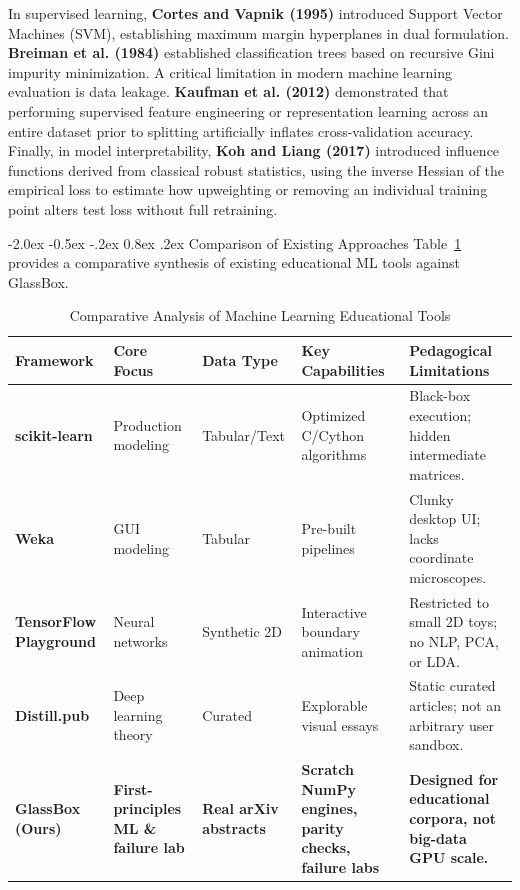 \documentclass[12pt,a4paper]{report}
\makeatletter
\renewcommand\section{\@startsection {section}{1}{\z@}%
                                   {-2.0ex \@plus -0.5ex \@minus -.2ex}%
                                   {0.8ex \@plus.2ex}%
                                   {\normalfont\fontsize{14}{17}\bfseries\color{headerblue}}}
\makeatother
\begin{document}
In supervised learning, \textbf{Cortes and Vapnik (1995)} \cite{vapnik1995} introduced Support Vector Machines (SVM), establishing maximum margin hyperplanes in dual formulation. \textbf{Breiman et al. (1984)} \cite{breiman1984} established classification trees based on recursive Gini impurity minimization. A critical limitation in modern machine learning evaluation is data leakage. \textbf{Kaufman et al. (2012)} \cite{kaufman2012} demonstrated that performing supervised feature engineering or representation learning across an entire dataset prior to splitting artificially inflates cross-validation accuracy. Finally, in model interpretability, \textbf{Koh and Liang (2017)} \cite{koh2017} introduced influence functions derived from classical robust statistics, using the inverse Hessian of the empirical loss to estimate how upweighting or removing an individual training point alters test loss without full retraining.

\section{Comparison of Existing Approaches}
Table~\ref{tab:lit_review} provides a comparative synthesis of existing educational ML tools against GlassBox.

\begin{table}[!ht]
\centering
\caption[Comparative Analysis of Educational ML Tools]{Comparative Analysis of Machine Learning Educational Tools}
\label{tab:lit_review}
\small
\begin{tabular}{|p{2.1cm}|p{2.6cm}|p{2.0cm}|p{3.4cm}|p{3.8cm}|}
\hline
\textbf{Framework} & \textbf{Core Focus} & \textbf{Data Type} & \textbf{Key Capabilities} & \textbf{Pedagogical Limitations} \\ \hline
\textbf{scikit-learn} \cite{scikit-learn} & Production modeling & Tabular/Text & Optimized C/Cython algorithms & Black-box execution; hidden intermediate matrices. \\ \hline
\textbf{Weka} & GUI modeling & Tabular & Pre-built pipelines & Clunky desktop UI; lacks coordinate microscopes. \\ \hline
\textbf{TensorFlow Playground} & Neural networks & Synthetic 2D & Interactive boundary animation & Restricted to small 2D toys; no NLP, PCA, or LDA. \\ \hline
\textbf{Distill.pub} & Deep learning theory & Curated & Explorable visual essays & Static curated articles; not an arbitrary user sandbox. \\ \hline
\textbf{GlassBox (Ours)} & \textbf{First-principles ML \& failure lab} & \textbf{Real arXiv abstracts} & \textbf{Scratch NumPy engines, parity checks, failure labs} & \textbf{Designed for educational corpora, not big-data GPU scale.} \\ \hline
\end{tabular}
\end{table}
\end{document}

